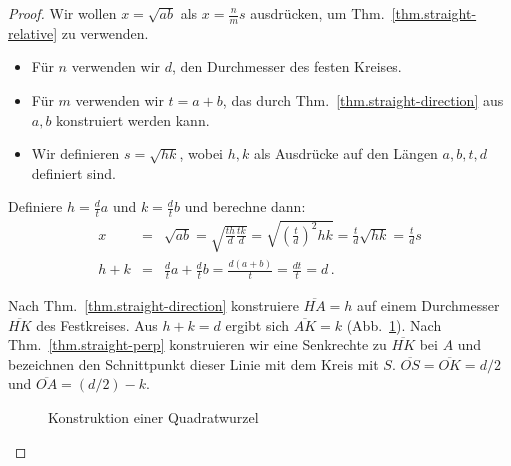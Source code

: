 \begin{proof}
Wir wollen $x=\sqrt{ab}$ als $x=\displaystyle\frac{n}{m}s$ ausdrücken, um Thm.~\ref{thm.straight-relative} zu verwenden.
\begin{itemize}
\item Für $n$ verwenden wir $d$, den Durchmesser des festen Kreises.
\item Für $m$ verwenden wir $t=a+b$, das durch Thm.~\ref{thm.straight-direction} aus $a,b$ konstruiert werden kann.
\item Wir definieren $s=\sqrt{hk}$, wobei $h,k$ als Ausdrücke auf den Längen $a,b,t,d$ definiert sind.
\end{itemize}
Definiere $h=\displaystyle\frac{d}{t}a$ und $k=\displaystyle\frac{d}{t}b$ und berechne dann:
\begin{eqnarray*}
x&=&\sqrt{ab}=\sqrt{\frac{th}{d}\frac{tk}{d}}=\sqrt{\left(\frac{t}{d}\right)^2hk}=\frac{t}{d}\sqrt{hk}=\frac{t}{d}s\\
h+k &=& \frac{d}{t}a + \frac{d}{t}b = \frac{d(a+b)}{t} = \frac{dt}{t} = d\,.
\end{eqnarray*}

Nach Thm.~\ref{thm.straight-direction} konstruiere $\overline{HA}= h$ auf einem Durchmesser $\overline{HK}$ des Festkreises. Aus $h+k=d$ ergibt sich $\overline{AK}=k$ (Abb.~\ref{f.se-sqrt}). Nach Thm.~\ref{thm.straight-perp} konstruieren wir eine Senkrechte zu $\overline{HK}$ bei $A$ und bezeichnen den Schnittpunkt dieser Linie mit dem Kreis mit $S$. $\overline{OS}=\overline{OK}=d/2$ und $\overline{OA}=(d/2)-k$. 
\begin{figure}[b]
\begin{center}
\end{center}
\caption{Konstruktion einer Quadratwurzel}\label{f.se-sqrt}
\end{figure}


\end{proof}
